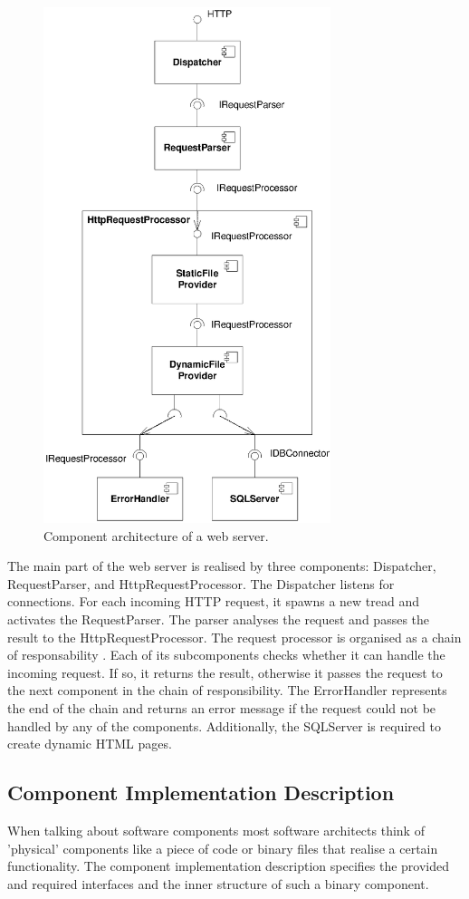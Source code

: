 \begin{figure}[htbp]
\centering
\includegraphics[width=3.3in]{example/WebserverComponents}
\caption{Component architecture of a web server.}
\label{fig:WebserverComponents}
\end{figure}

The main part of the web server is realised by three components: Dispatcher,
RequestParser, and HttpRequestProcessor. The Dispatcher listens for connections.
For each incoming HTTP request, it spawns a new tread and
activates the RequestParser. The parser analyses the request and passes the
result to the HttpRequestProcessor. The request processor is organised as a
chain of responsability \cite{gamma1995a}. Each of its subcomponents checks
whether it can handle the incoming request. If so, it returns the result,
otherwise it passes the request to the next component in the chain of
responsibility. The ErrorHandler represents the end of the chain and returns an
error message if the request could not be handled by any of the components.
Additionally, the SQLServer is required to create dynamic HTML pages.

\subsection{Component Implementation Description}
When talking about software components most software architects think of
'physical' components like a piece of code or binary files that
realise a certain functionality. The component implementation description
specifies the provided and required interfaces and the inner structure of
such a binary component.

